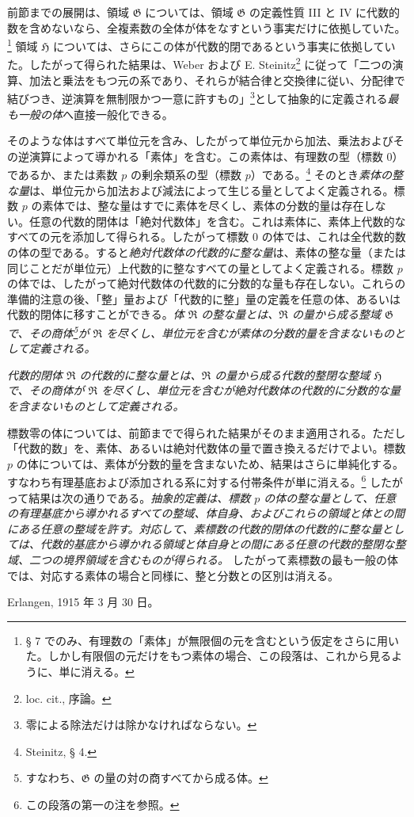前節までの展開は、領域 $\mathfrak G$ については、領域 $\mathfrak G$ の定義性質 III と IV に代数的数を含めないなら、全複素数の全体が体をなすという事実だけに依拠していた。\footnote{§ 7 でのみ、有理数の「素体」が無限個の元を含むという仮定をさらに用いた。しかし有限個の元だけをもつ素体の場合、この段落は、これから見るように、単に消える。} 領域 $\mathfrak H$ については、さらにこの体が代数的閉であるという事実に依拠していた。したがって得られた結果は、Weber および E. Steinitz\footnote{loc. cit., 序論。} に従って「二つの演算、加法と乗法をもつ元の系であり、それらが結合律と交換律に従い、分配律で結びつき、逆演算を無制限かつ一意に許すもの」\footnote{零による除法だけは除かなければならない。}として抽象的に定義される\emph{最も一般の体}へ直接一般化できる。

そのような体はすべて単位元を含み、したがって単位元から加法、乗法およびその逆演算によって導かれる「素体」を含む。この素体は、有理数の型（標数 $0$）であるか、または素数 $p$ の剰余類系の型（標数 $p$）である。\footnote{Steinitz, § 4.} そのとき\emph{素体の整な量}は、単位元から加法および減法によって生じる量としてよく定義される。標数 $p$ の素体では、整な量はすでに素体を尽くし、素体の分数的量は存在しない。任意の代数的閉体は「絶対代数体」を含む。これは素体に、素体上代数的なすべての元を添加して得られる。したがって標数 $0$ の体では、これは全代数的数の体の型である。すると\emph{絶対代数体の代数的に整な量}は、素体の整な量（または同じことだが単位元）上代数的に整なすべての量としてよく定義される。標数 $p$ の体では、したがって絶対代数体の代数的に分数的な量も存在しない。これらの準備的注意の後、「整」量および「代数的に整」量の定義を任意の体、あるいは代数的閉体に移すことができる。\emph{体 $\mathfrak R$ の整な量とは、$\mathfrak R$ の量から成る整域 $\mathfrak G$ で、その商体\footnote{すなわち、$\mathfrak G$ の量の対の商すべてから成る体。}が $\mathfrak R$ を尽くし、単位元を含むが素体の分数的量を含まないものとして定義される。}

\emph{代数的閉体 $\mathfrak R$ の代数的に整な量とは、$\mathfrak R$ の量から成る代数的整閉な整域 $\mathfrak H$ で、その商体が $\mathfrak R$ を尽くし、単位元を含むが絶対代数体の代数的に分数的な量を含まないものとして定義される。}

標数零の体については、前節までで得られた結果がそのまま適用される。ただし「代数的数」を、素体、あるいは絶対代数体の量で置き換えるだけでよい。標数 $p$ の体については、素体が分数的量を含まないため、結果はさらに単純化する。すなわち有理基底および添加される系に対する付帯条件が単に消える。\footnote{この段落の第一の注を参照。} したがって結果は次の通りである。\emph{抽象的定義は、標数 $p$ の体の整な量として、任意の有理基底から導かれるすべての整域、体自身、およびこれらの領域と体との間にある任意の整域を許す。対応して、素標数の代数的閉体の代数的に整な量としては、代数的基底から導かれる領域と体自身との間にある任意の代数的整閉な整域、二つの境界領域を含むものが得られる。} したがって素標数の最も一般の体では、対応する素体の場合と同様に、整と分数との区別は消える。

\medskip
\noindent Erlangen, 1915 年 3 月 30 日。

\clearpage
